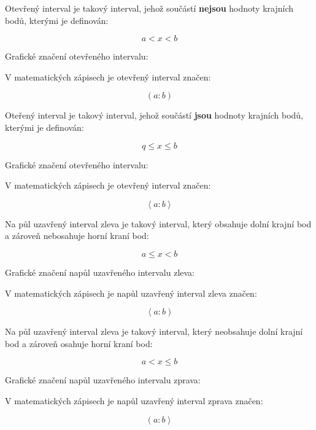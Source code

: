 
Otevřený interval je takový interval, jehož součástí {\bf nejsou} hodnoty krajních bodů, kterými je definován:

$$ a < x < b $$

Grafické značení otevřeného intervalu:

\vskip 4mm
\centerline{}
\vskip 4mm

V matematických zápisech je otevřený interval značen:

$$ \left(a:b\right) $$


Oteřený interval je takový interval, jehož součástí {\bf jsou} hodnoty krajních bodů, kterými je definován:

$$ q \leq x \leq b $$

Grafické značení otevřeného intervalu:

\vskip 4mm
\centerline{}
\vskip 4mm

V matematických zápisech je otevřený interval značen:

$$ \left< a:b \right> $$


Na půl uzavřený interval zleva je takový interval, který obsahuje dolní krajní bod a zároveň nebosahuje horní kraní bod:

$$ a \leq x < b $$

Grafické značení napůl uzavřeného intervalu zleva:

\vskip 4mm
\centerline{}
\vskip 4mm

V matematických zápisech je napůl uzavřený interval zleva značen:

$$ \left< a:b\right) $$


Na půl uzavřený interval zleva je takový interval, který neobsahuje dolní krajní bod a zároveň osahuje horní kraní bod:

$$ a<x \leq b $$

Grafické značení napůl uzavřeného intervalu zprava:

\vskip 4mm
\centerline{}
\vskip 4mm

V matematických zápisech je napůl uzavřený interval zprava značen:

$$ \left( a:b \right>  $$


